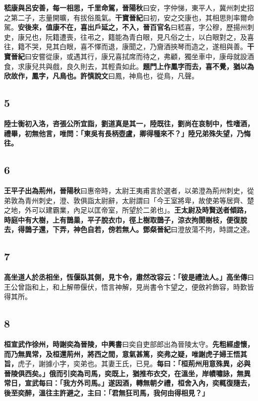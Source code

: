 \textbf{嵇康與呂安善，每一相思，千里命駕，}{\footnotesize \textbf{晉陽秋}曰安，字仲悌，東平人，冀州刺史招之第二子，志量開曠，有拔俗風氣。\textbf{干寶晉紀}曰初，安之交康也，其相思則率爾命駕。}\textbf{安後來，值康不在，喜出戶延之，不入，}{\footnotesize \textbf{晉百官名}曰嵇喜，字公穆，歷揚州刺史，康兄也，阮籍遭喪，往弔之，籍能為青白眼，見凡俗之士，以白眼對之，及喜往，籍不哭，見其白眼，喜不懌而退，康聞之，乃齎酒挾琴而造之，遂相與善。\textbf{干寶晉紀}曰安嘗從康，或遇其行，康兄喜拭席而待之，弗顧，獨坐車中，康母就設酒食，求康兒共與戲，良久則去，其輕貴如此。}\textbf{題門上作鳳字而去，喜不覺，猶以為欣故作，鳳字，凡鳥也。}{\footnotesize \textbf{許慎說文}曰鳳，神鳥也，從鳥，凡聲。}

\subsection*{5}

\textbf{陸士衡初入洛，咨張公所宜詣，劉道真是其一，陸既往，劉尚在哀制中，性嗜酒，禮畢，初無他言，唯問：「東吳有長柄壺盧，卿得種來不？」陸兄弟殊失望，乃悔往。}

\subsection*{6}

\textbf{王平子出為荊州，}{\footnotesize \textbf{晉陽秋}曰惠帝時，太尉王夷甫言於選者，以弟澄為荊州刺史，從弟敦為青州刺史，澄、敦俱詣太尉辭，太尉謂曰「今王室將卑，故使弟等居齊、楚之地，外可以建霸業，內足以匡帝室，所望於二弟也」。}\textbf{王太尉及時賢送者傾路，時庭中有大樹，上有鵲巢，平子脫衣巾，徑上樹取鵲子，涼衣拘閡樹枝，便復脫去，得鵲子還，下弄，神色自若，傍若無人。}{\footnotesize \textbf{鄧粲晉紀}曰澄放蕩不拘，時謂之達。}

\subsection*{7}

\textbf{高坐道人於丞相坐，恆偃臥其側，見卞令，肅然改容云：「彼是禮法人。」}{\footnotesize \textbf{高坐傳}曰王公曾詣和上，和上解帶偃伏，悟言神解，見尚書令卞望之，便斂衿飾容，時歎皆得其所。}

\subsection*{8}

\textbf{桓宣武作徐州，時謝奕為晉陵，}{\footnotesize \textbf{中興書}曰奕自吏部郎出為晉陵太守。}\textbf{先粗經虛懷，而乃無異常，及桓還荊州，將西之間，意氣甚篤，奕弗之疑，唯謝虎子婦王悟其旨，}{\footnotesize 虎子，謝據小字，奕弟也。其妻王氏，已見。}\textbf{每曰：「桓荊州用意殊異，必與晉陵俱西矣。」俄而引奕為司馬，奕既上，猶推布衣交，在溫坐，岸幘嘯詠，無異常日，宣武每曰：「我方外司馬。」遂因酒，轉無朝夕禮，桓舍入內，奕輒復隨去，後至奕醉，溫往主許避之，主曰：「君無狂司馬，我何由得相見？」}

